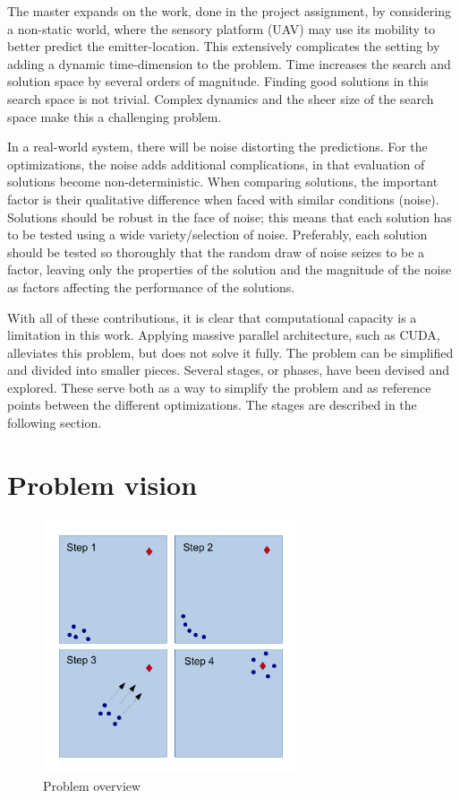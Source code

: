 \documentclass[10pt,a4paper]{book}
\begin{document}
The master expands on the work, done in the project assignment, by considering a non-static world, where the sensory platform (\gls{UAV}) may use its mobility to better predict the emitter-location. This extensively complicates the setting by adding a dynamic time-dimension to the problem. Time increases the search and solution space by several orders of magnitude. Finding good solutions in this search space is not trivial. Complex dynamics and the sheer size of the search space make this a challenging problem.


In a real-world system, there will be noise distorting the predictions. For the optimizations, the noise adds additional complications, in that evaluation of solutions become non-deterministic. When comparing solutions, the important factor is their qualitative difference when faced with similar conditions (noise). Solutions should be robust in the face of noise; this means that each solution has to be tested using a wide variety/selection of noise. Preferably, each solution should be tested so thoroughly that the random draw of noise seizes to be a factor, leaving only the properties of the solution and the magnitude of the noise as factors affecting the performance of the solutions.

With all of these contributions, it is clear that computational capacity is a limitation in this work. Applying massive parallel architecture, such as \gls{CUDA}, alleviates this problem, but does not solve it fully. The problem can be simplified and divided into smaller pieces. Several stages, or phases, have been devised and explored. These serve both as a way to simplify the problem and as reference points between the different optimizations. The stages are described in the following section.

\newpage

\section{Problem vision}
\label{IPV}

\begin{figure}[H]
\centering
\includegraphics[width=75mm]{problemoverview.pdf}
\caption{Problem overview}
\label{problemoverview}
\end{figure}
\end{document}
